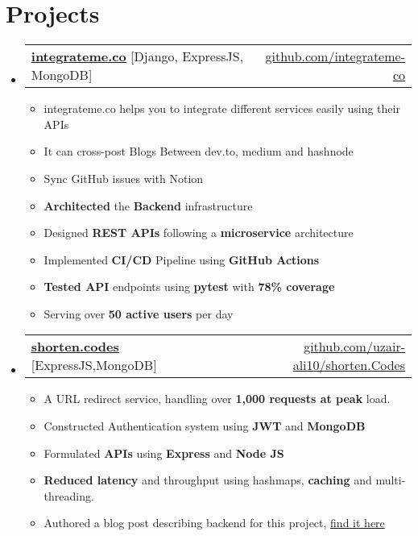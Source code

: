 \documentclass[letterpaper,11pt]{article}
\makeatletter
\newcommand{\resumeItem}[1]{
  \item\small{
    {#1 \vspace{-2pt}}
  }
}
\newcommand{\resumeProjectHeading}[2]{
    \item
    \begin{tabular*}{0.97\textwidth}{l@{\extracolsep{\fill}}r}
      \small#1 & #2 \\
    \end{tabular*}\vspace{-7pt}
}
\newcommand{\resumeSubHeadingListStart}{\begin{itemize}[leftmargin=0.15in, label={}]}
\newcommand{\resumeSubHeadingListEnd}{\end{itemize}}
\newcommand{\resumeItemListStart}{\begin{itemize}}
\newcommand{\resumeItemListEnd}{\end{itemize}\vspace{-5pt}}
\makeatother
\begin{document}
\section{Projects}
    \resumeSubHeadingListStart
      \resumeProjectHeading
          {\textbf{\href{https://integrateme.co/}{\underline{integrateme.co}}}{  [Django, ExpressJS, MongoDB]}}{\href{https://github.com/integrateme-co/}{github.com/integrateme-co}}
          \resumeItemListStart
           \resumeItem{integrateme.co helps you to integrate different services easily using their APIs}
           \resumeItem{It can cross-post Blogs Between dev.to, medium and hashnode}
           \resumeItem{Sync GitHub issues with Notion}
           \resumeItem{\textbf{Architected} the \textbf{Backend} infrastructure}
           \resumeItem{Designed \textbf{REST APIs} following a \textbf{microservice} architecture}
           \resumeItem{Implemented \textbf{CI/CD} Pipeline using \textbf{GitHub Actions}}
           \resumeItem{\textbf{Tested API} endpoints using \textbf{pytest} with \textbf{78\% coverage}}
           \resumeItem{Serving over \textbf{50 active users} per day}
          \resumeItemListEnd
    \resumeSubHeadingListEnd
    
\resumeSubHeadingListStart
      \resumeProjectHeading
       {\textbf{\href{https://shorten.codes/}{\underline{shorten.codes}}}{          [ExpressJS,MongoDB]}}{\href{https://github.com/uzair-ali10/shorten.Codes/}{github.com/uzair-ali10/shorten.Codes}}
          \resumeItemListStart
           \resumeItem{A URL redirect service, handling over \textbf{1,000 requests at peak} load.}
           \resumeItem{Constructed Authentication system using \textbf{JWT} and \textbf{MongoDB}}
           \resumeItem{Formulated \textbf{APIs} using \textbf{Express} and \textbf{Node JS}}
           \resumeItem{\textbf{Reduced latency}  and throughput using hashmaps, \textbf{caching} and multi-threading.}
           \resumeItem{Authored a blog post describing backend for this project, \href{https://medium.com/@uzair-ali10/building-backend-of-a-url-shortening-service-part-i-b3b834895900}{find it here}}
          \resumeItemListEnd
    \resumeSubHeadingListEnd
\end{document}
